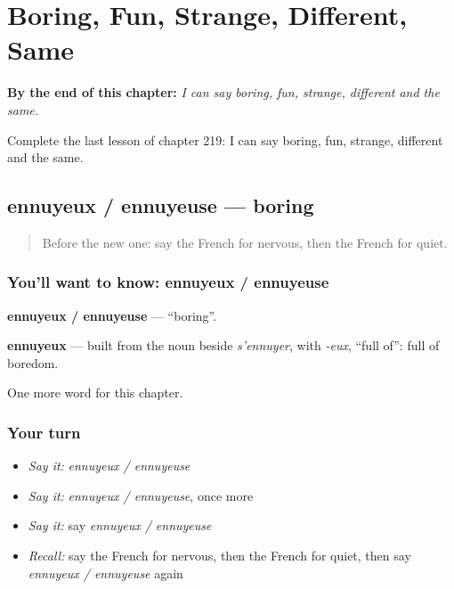 
\chapter{Boring, Fun, Strange, Different, Same}
\label{ch:fr-boring-fun-strange-different-same}

\begin{chapteropening}
\textbf{By the end of this chapter:} \emph{I can say boring, fun, strange, different and the same.}

Complete the last lesson of chapter 219: I can say boring, fun, strange, different and the same.
\end{chapteropening}

\section[ennuyeux / ennuyeuse]{ennuyeux / ennuyeuse — boring}

\label{lesson:FR-C219-ennuyeux-ennuyeuse}



\begin{quote}
Before the new one: say the French for nervous, then the French for quiet.
\end{quote}

\subsection*{You'll want to know: ennuyeux / ennuyeuse}
\textbf{ennuyeux / ennuyeuse} — \textquotedblleft{}boring\textquotedblright{}.

\begin{cousinweb}
\textbf{ennuyeux} — built from the noun beside \emph{s'ennuyer}, with \emph{-eux}, \textquotedblleft{}full of\textquotedblright{}: full of boredom.
\end{cousinweb}

\begin{grammarlens}[title={What you've built}]
One more word for this chapter.
\end{grammarlens}

\subsection*{Your turn}
\begin{itemize}
\raggedright
  \item \emph{Say it:} \emph{ennuyeux / ennuyeuse}
  \item \emph{Say it:} \emph{ennuyeux / ennuyeuse}, once more
  \item \emph{Say it:} say \emph{ennuyeux / ennuyeuse}
  \item \emph{Recall:} say the French for nervous, then the French for quiet, then say \emph{ennuyeux / ennuyeuse} again
\end{itemize}


